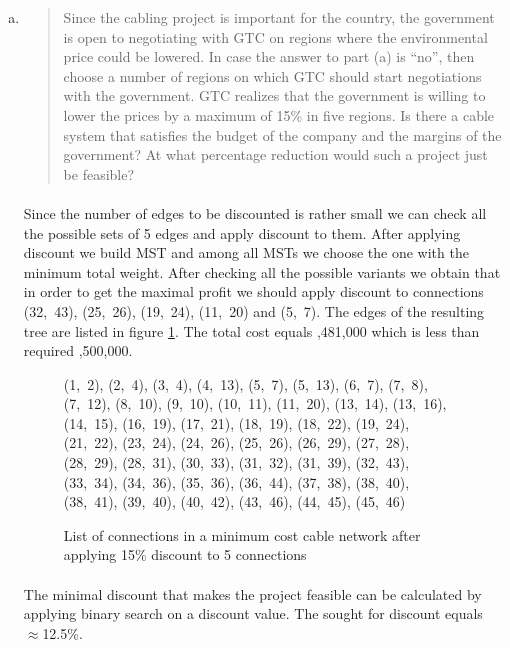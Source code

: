 \begin{enumerate}[(a)]
\item \begin{quote}Since the cabling project is important for the country, the government is open to
negotiating with GTC on regions where the environmental price could be lowered.
In case the answer to part (a) is ``no'', then choose a number of regions on
which GTC should start negotiations with the government.
GTC realizes that the government is willing to lower the prices by a maximum of
15\% in five regions. Is there a cable system that satisfies the budget of the company
and the margins of the government? At what percentage reduction would
such a project just be feasible?\end{quote}

	\paragraph{}
	Since the number of edges to be discounted is rather small we can check all the possible sets of 5 edges and apply discount to them. After applying discount we build MST and among all MSTs we choose the one with the minimum total weight. After checking all the possible variants we obtain that in order to get the maximal profit we should apply discount to connections (32,~43), (25,~26), (19,~24), (11,~20) and (5,~7). The edges of the resulting tree are listed in figure \ref{mst2-2-b}. The total cost equals ,481,000 which is less than required ,500,000.

\begin{figure}[H]
	\centering
	\begin{multicols}{5}
(1,~2), (2,~4), (3,~4), (4,~13), (5,~7), (5,~13), (6,~7), (7,~8), (7,~12), (8,~10), (9,~10), (10,~11), (11,~20), (13,~14), (13,~16), (14,~15), (16,~19), (17,~21), (18,~19), (18,~22), (19,~24), (21,~22), (23,~24), (24,~26), (25,~26), (26,~29), (27,~28), (28,~29), (28,~31), (30,~33), (31,~32), (31,~39), (32,~43), (33,~34), (34,~36), (35,~36), (36,~44), (37,~38), (38,~40), (38,~41), (39,~40), (40,~42), (43,~46), (44,~45), (45,~46)
	\end{multicols}
	\caption{List of connections in a minimum cost cable network after applying 15\% discount to 5 connections}
	\label{mst2-2-b}
\end{figure}

	\paragraph{}
	The minimal discount that makes the project feasible can be calculated by applying binary search on a discount value. The sought for discount equals $\approx$12.5\%.


\end{enumerate}
